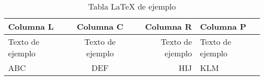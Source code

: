 \begin{table}[htp]
\centering


    
    \begin{tabular}{ | l | c | r | p{2cm} | }
        

        \hline
        \textbf{Columna L} & \textbf{Columna C} & \textbf{Columna R} & \textbf{Columna P}\\
        \hline
        
        Texto de ejemplo & Texto de ejemplo & Texto de ejemplo & Texto de ejemplo\\
        \hline
        ABC & DEF & HIJ & KLM\\
        \hline
        
    \end{tabular} 
    
    \caption{Tabla LaTeX de ejemplo}
    \label{table:ejemplo} 
\end{table}
